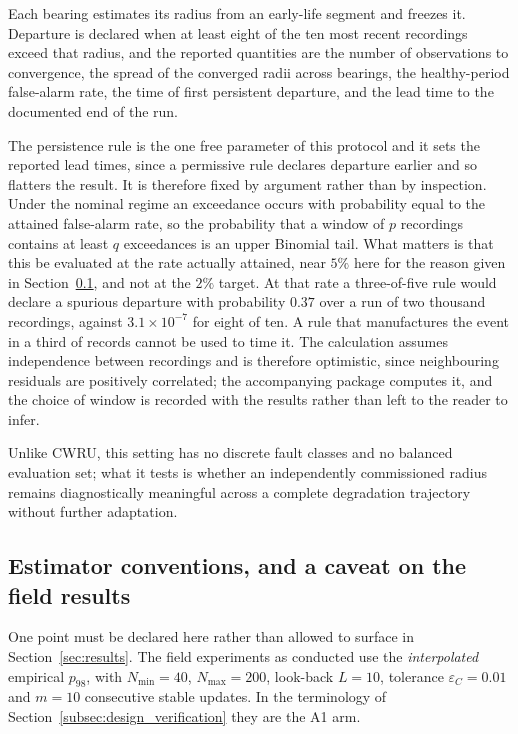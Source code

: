 \documentclass[a4paper]{cas-sc}
\begin{document}
Each bearing estimates its radius from an early-life segment and freezes it.
Departure is declared when at least eight of the ten most recent recordings
exceed that radius, and the reported quantities are the number of observations
to convergence, the spread of the converged radii across bearings, the
healthy-period false-alarm rate, the time of first persistent departure, and
the lead time to the documented end of the run.

The persistence rule is the one free parameter of this protocol and it sets
the reported lead times, since a permissive rule declares departure earlier
and so flatters the result. It is therefore fixed by argument rather than by
inspection. Under the nominal regime an exceedance occurs with probability
equal to the attained false-alarm rate, so the probability that a window of
\(p\) recordings contains at least \(q\) exceedances is an upper Binomial
tail. What matters is that this be evaluated at the rate actually attained,
near \(5\%\) here for the reason given in
Section~\ref{subsec:design_caveat}, and not at the \(2\%\) target. At that
rate a three-of-five rule would declare a spurious departure with probability
\(0.37\) over a run of two thousand recordings, against \(3.1\times10^{-7}\)
for eight of ten. A rule that manufactures the event in a third of records
cannot be used to time it. The calculation assumes independence between
recordings and is therefore optimistic, since neighbouring residuals are
positively correlated; the accompanying package computes it, and the choice of
window is recorded with the results rather than left to the reader to infer.

Unlike CWRU, this setting has no discrete fault classes and no balanced
evaluation set; what it tests is whether an independently commissioned radius
remains diagnostically meaningful across a complete degradation trajectory
without further adaptation.

\subsection{Estimator conventions, and a caveat on the field results}
\label{subsec:design_caveat}

One point must be declared here rather than allowed to surface in
Section~\ref{sec:results}. The field experiments as conducted use the
\emph{interpolated} empirical \(p_{98}\), with \(N_{\min}=40\),
\(N_{\max}=200\), look-back \(L=10\), tolerance
\(\varepsilon_C=0.01\) and \(m=10\) consecutive stable updates. In the
terminology of Section~\ref{subsec:design_verification} they are the A1 arm.
\end{document}
